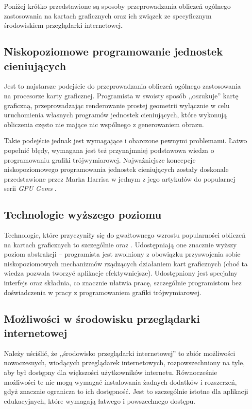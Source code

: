 Poniżej krótko przedstawione są sposoby przeprowadzania obliczeń ogólnego
zastosowania na kartach graficznych oraz ich związek ze specyficznym
środowiskiem przeglądarki internetowej.

\subsection{Niskopoziomowe programowanie jednostek cieniujących}
\label{subsec:niskProgJedn}

Jest to najstarsze podejście do przeprowadzania obliczeń ogólnego zastosowania
na procesorze karty graficznej. Programista w swoisty sposób ,,oszukuje'' kartę
graficzną, przeprowadzając renderowanie prostej geometrii wyłącznie w celu
uruchomienia własnych programów jednostek cieniujących, które wykonują
obliczenia często nie mające nic wspólnego z generowaniem obrazu.

Takie podejście jednak jest wymagające i obarczone pewnymi problemami. Łatwo
popełnić błędy, wymagana jest też przynajmniej podstawowa wiedza o programowaniu
grafiki trójwymiarowej. Najważniejsze koncepcje niskopoziomowego programowania
jednostek cieniujących zostały doskonale przedstawione przez Marka Harrisa w
jednym z jego artykułów do popularnej serii \emph{GPU Gems} \cite{GPUConcepts}.

\subsection{Technologie wyższego poziomu}
\label{subsec:techWyzPoz}

Technologie, które przyczyniły się do gwałtownego wzrostu popularności obliczeń
na kartach graficznych to szczególnie  oraz .
Udostępniają  one znacznie wyższy poziom abstrakcji -- programista jest
zwolniony z obowiązku przyswojenia sobie niskopoziomowych mechanizmów rządzących
działaniem kart graficznych (choć ta wiedza pozwala tworzyć aplikacje
efektywniejsze). Udostępniony jest specjalny interfejs oraz składnia, co
znacznie ułatwia pracę, szczególnie programistom bez doświadczenia w pracy z
programowaniem grafiki trójwymiarowej.

\subsection{Możliwości w środowisku przeglądarki internetowej}
\label{subsec:srodPrzegInt}

Należy uściślić, że ,,środowisko przeglądarki internetowej'' to zbiór możliwości
nowoczesnych, wiodących przeglądarek internetowych, rozpowszechniony na tyle,
aby był dostępny dla większości użytkowników internetu. Równocześnie możliwości
te nie mogą wymagać instalowania żadnych dodatków i rozszerzeń, gdyż znacznie
ogranicza to ich dostępność. Jest to szczególnie istotne dla aplikacji
edukacyjnych, które wymagają łatwego i powszechnego dostępu.

